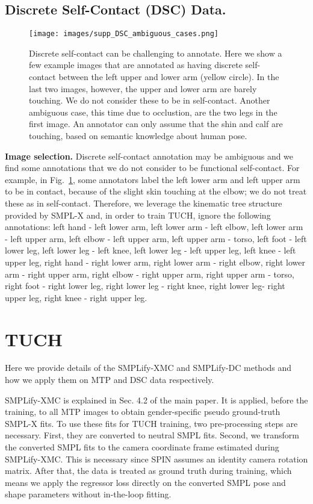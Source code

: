 \documentclass[final]{cvpr}
\newcommand{\mtp}{\mbox{MTP}\xspace}
\newcommand{\smplifyxmc}{\mbox{SMPLify-XMC}\xspace}
\newcommand{\smplifyxdc}{\mbox{SMPLify-DC}\xspace}
\theoremstyle{definition}
\begin{document}
\subsection{ Discrete Self-Contact (DSC) Data.} 
\label{subsection:DSC}
\begin{figure}
	\begin{center}
		\texttt{[image: images/supp\_DSC\_ambiguous\_cases.png]}
	\end{center}
	\caption{Discrete self-contact can be challenging to annotate. Here we show a few example images that are annotated as having discrete self-contact between the left upper and lower arm (yellow circle). In the last two images, however, the upper and lower arm are barely touching. We do not consider these to be in self-contact. Another ambiguous case, this time due to occlustion, are the two legs in the first image. An annotator can only assume that the shin and calf are touching, based on semantic knowledge about human pose.}
	\label{fig:DFExamples}
\end{figure}

\textbf{Image selection.} Discrete self-contact annotation may be ambiguous and we find some annotations that we do not consider to be functional self-contact. For example, in Fig.~\ref{fig:DFExamples}, some annotators label the left lower arm and left upper arm to be in contact, because of the slight skin touching at the elbow; we do not treat these as in self-contact. Therefore, we leverage the kinematic tree structure provided by SMPL-X and, in order to train TUCH, ignore the following annotations:
left hand - left lower arm,
left lower arm - left elbow,
left lower arm - left upper arm,
left elbow - left upper arm,
left upper arm - torso,
left foot - left lower leg,
left lower leg - left knee,
left lower leg - left upper leg,
left knee - left upper leg,
right hand - right lower arm,
right lower arm - right elbow,
right lower arm - right upper arm,
right elbow - right upper arm,
right upper arm - torso,
right foot - right lower leg,
right lower leg - right knee,
right lower leg- right upper leg,
right knee - right upper leg.
 	\section{TUCH}

Here we provide details of the \smplifyxmc and \smplifyxdc methods and how we apply them on MTP and DSC data respectively. 

\smplifyxmc is explained in Sec. 4.2 of the main paper. 
It is applied, before the training, to all \mtp images to obtain gender-specific pseudo ground-truth SMPL-X fits. 
To use these fits for TUCH training, two pre-processing steps are necessary. 
First, they are converted to neutral SMPL fits. 
Second, we transform the converted SMPL fits to the camera coordinate frame estimated during \smplifyxmc. 
This is necessary since SPIN assumes an identity camera rotation matrix. 
After that, the data is treated as ground truth during training, which means we apply the regressor loss directly on the converted SMPL pose and shape parameters without in-the-loop fitting.
\end{document}
